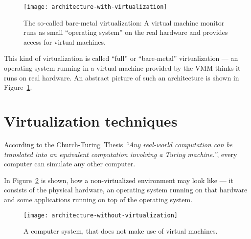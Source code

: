 \begin{figure}[htbp]
  \begin{center}
  \begin{minipage}{0.75\textwidth}
    \begin{center}
      \texttt{[image: architecture-with-virtualization]}
    \end{center}
    \caption[Virtualization   architecture]{The   so-called   bare-metal
      virtualization:   A  virtual   machine  monitor   runs   as  small
      ``operating system'' on the  real hardware and provides access for
      virtual machines.}
    \label{fig:arch-virt}
  \end{minipage}
  \end{center}
\end{figure}

This  kind   of  virtualization  is  called   ``full''  or  ``bare-metal''
virtualization  ---  an operating  system  running  in  a virtual  machine
provided by the  VMM thinks it runs on real  hardware. An abstract picture
of such an architecture is shown in Figure~\ref{fig:arch-virt}.

\section{Virtualization techniques}
\label{sec:techniques}

According   to    the   Church-Turing~Thesis   \cite{church_turing_thesis}
\emph{``Any real-world  computation can  be translated into  an equivalent
  computation involving  a Turing machine.''}, every  computer can simulate
any other computer.

\bigskip

In Figure~\ref{fig:arch-novirt} is  shown, how a non-virtualized environment
may  look like  --- it  consists of  the physical  hardware,  an operating
system running  on that hardware and  some applications running  on top of
the operating system.

\begin{figure}[htbp]
  \begin{center}
    \begin{minipage}{0.75\textwidth}
      \begin{center}
        \texttt{[image: architecture-without-virtualization]}
      \end{center}
      \caption[No virtualization]{A computer system, that does not make use of
        virtual machines.}
      \label{fig:arch-novirt}
    \end{minipage}
  \end{center}
\end{figure}

